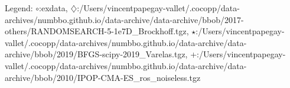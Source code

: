 Legend: {\color{CornflowerBlue}$\circ$}:exdata, {\color{Orange}$\diamondsuit$}:/Users/vincentpapegay-vallet/.cocopp/data-archives/numbbo.github.io/data-archive/data-archive/bbob/2017-others/RANDOMSEARCH-5-1e7D\_Brockhoff.tgz, {\color{Green}$\star$}:/Users/vincentpapegay-vallet/.cocopp/data-archives/numbbo.github.io/data-archive/data-archive/bbob/2019/BFGS-scipy-2019\_Varelas.tgz, {\color{red}+}:/Users/vincentpapegay-vallet/.cocopp/data-archives/numbbo.github.io/data-archive/data-archive/bbob/2010/IPOP-CMA-ES\_ros\_noiseless.tgz